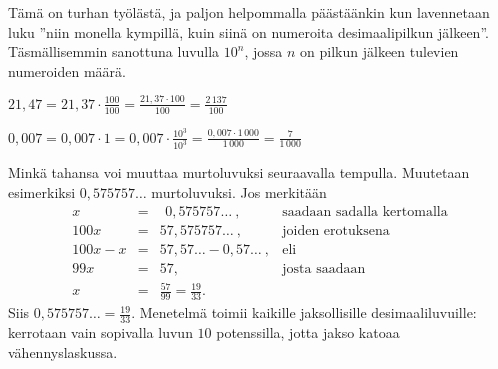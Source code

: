Tämä on turhan työlästä, ja paljon helpommalla päästäänkin kun lavennetaan luku ''niin monella kympillä, kuin siinä on numeroita desimaalipilkun jälkeen''. Täsmällisemmin sanottuna luvulla $10^n$, jossa $n$ on pilkun jälkeen tulevien numeroiden määrä.

\begin{esimerkki}
$21,47 = 21,37 \cdot  \frac{100}{100} = \frac{21,37 \cdot 100}{100} = \frac{2\,137}{100}$
\end{esimerkki}

\begin{esimerkki}
$0,007 = 0,007 \cdot 1 = 0,007 \cdot \frac{10^3}{10^3} = \frac{0,007 \cdot 1\,000}{1\,000} = \frac{7}{1\,000}$

\end{esimerkki}


Minkä tahansa  voi muuttaa murtoluvuksi seuraavalla tempulla. Muutetaan esimerkiksi $0,575757\ldots$ murtoluvuksi. Jos merkitään
\[
\begin{array}{rcll}
x &=& \ \, 0,575757 \ldots\ , &\textrm{saadaan sadalla kertomalla} \\
100x &=& 57,575757 \ldots \ , &\textrm{joiden erotuksena} \\
100x - x &=& 57,57 \ldots - 0,57 \ldots \ , & \textrm{eli} \\
99x &=& 57, & \textrm{josta saadaan} \\
x &=& \frac{57}{99} = \frac{19}{33}.
\end{array}
\]
Siis $0,575757\ldots = \frac{19}{33}$. Menetelmä toimii kaikille jaksollisille desimaaliluvuille: kerrotaan vain sopivalla luvun $10$ potenssilla, jotta jakso katoaa vähennyslaskussa.

